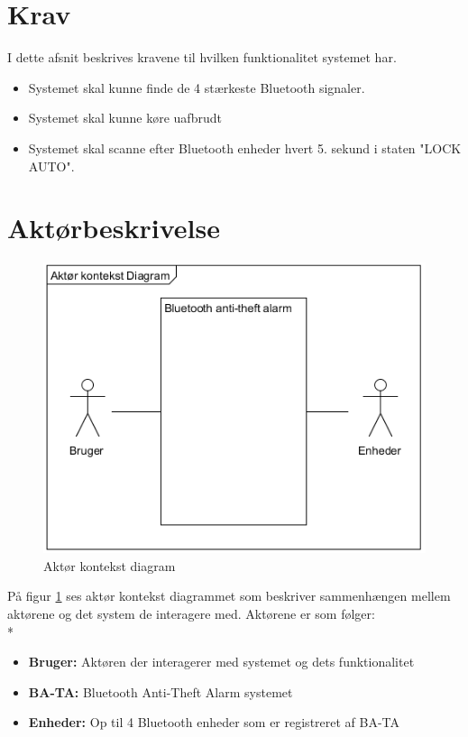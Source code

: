\graphicspath{{Chapters/Krav/}}


\section{Krav}
I dette afsnit beskrives kravene til hvilken funktionalitet systemet har. 

\begin{itemize}
\item Systemet skal kunne finde de 4 stærkeste Bluetooth signaler. 
\item Systemet skal kunne køre uafbrudt
\item Systemet skal scanne efter Bluetooth enheder hvert 5. sekund i staten "LOCK AUTO".
\end{itemize}

\section{Aktørbeskrivelse}

\begin{figure}[H]
	\centering
	\includegraphics[width = 200 pt]{Img/Aktoer_Kontekst.png}
	\caption{Aktør kontekst diagram}
	\label{fig:Aktoer Kontekst diagram}
\end{figure}

På figur \ref{fig:Aktoer Kontekst diagram} ses aktør kontekst diagrammet som beskriver sammenhængen mellem aktørene og det system de interagere med. Aktørene er som følger: \\*
\begin{itemize}
\item \textbf{Bruger:} Aktøren der interagerer med systemet og dets funktionalitet \\
\item \textbf{BA-TA:} Bluetooth Anti-Theft Alarm systemet\\
\item \textbf{Enheder:} Op til 4 Bluetooth enheder som er registreret af BA-TA \\
\end{itemize}

